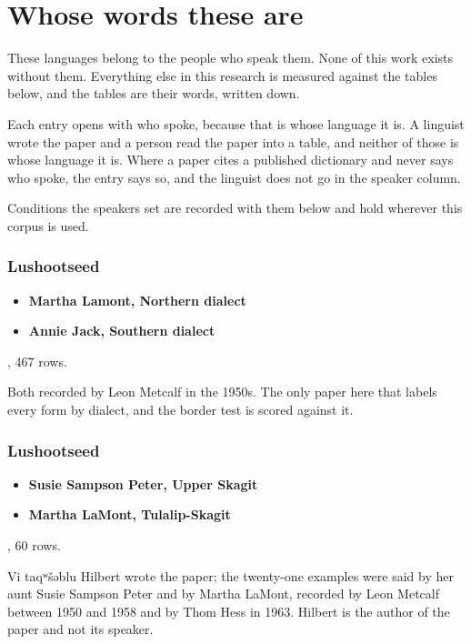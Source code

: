 \chapter{Whose words these are}

These languages belong to the people who speak them. None of this work exists without them. Everything else in this research is measured against the tables below, and the tables are their words, written down.

Each entry opens with who spoke, because that is whose language it is. A linguist wrote the paper and a person read the paper into a table, and neither of those is whose language it is. Where a paper cites a published dictionary and never says who spoke, the entry says so, and the linguist does not go in the speaker column.

Conditions the speakers set are recorded with them below and hold wherever this corpus is used.

\subsection{Lushootseed}

\begin{itemize}
\item \textbf{Martha Lamont, Northern dialect}
\item \textbf{Annie Jack, Southern dialect}
\end{itemize}

\cite{src:Mellesmoen-and-Kye-2026}, 467 rows.

Both recorded by Leon Metcalf in the 1950s. The only paper here that labels every form by dialect, and the border test is scored against it.

\subsection{Lushootseed}

\begin{itemize}
\item \textbf{Susie Sampson Peter, Upper Skagit}
\item \textbf{Martha LaMont, Tulalip-Skagit}
\end{itemize}

\cite{src:Hilbert-1983}, 60 rows.

Vi taqʷšəblu Hilbert wrote the paper; the twenty-one examples were said by her aunt Susie Sampson Peter and by Martha LaMont, recorded by Leon Metcalf between 1950 and 1958 and by Thom Hess in 1963. Hilbert is the author of the paper and not its speaker.

